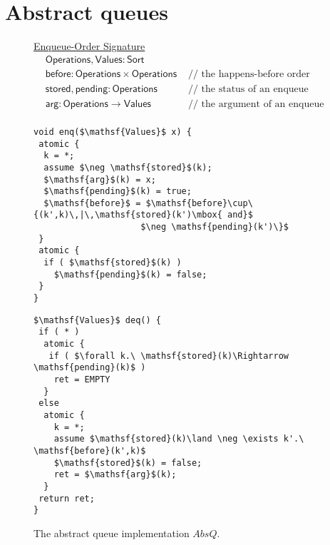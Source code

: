 \section{Abstract queues}


\begin{figure}[t]
{	\centering
	\underline{Enqueue-Order Signature}
	\begin{align*}
		& \mathsf{Operations}, \mathsf{Values} : \mathsf{Sort} \\
		& \mathsf{before} : \mathsf{Operations} \times \mathsf{Operations} &\mbox{ // the happens-before order between enqueues} \\
		& \mathsf{stored}, \mathsf{pending} : \mathsf{Operations} &\mbox{ // the status of an enqueue} \\
		& \mathsf{arg} : \mathsf{Operations} \rightarrow \mathsf{Values} &\mbox{ // the argument of an enqueue} \\
	\end{align*}
}

\begin{minipage}[t]{6cm}
\begin{lstlisting}
void enq($\mathsf{Values}$ x) {
 atomic {
  k = *; 
  assume $\neg \mathsf{stored}$(k);
  $\mathsf{arg}$(k) = x;
  $\mathsf{pending}$(k) = true;
  $\mathsf{before}$ = $\mathsf{before}\cup\{(k',k)\,|\,\mathsf{stored}(k')\mbox{ and}$
                     $\neg \mathsf{pending}(k')\}$  
 }
 atomic {
  if ( $\mathsf{stored}$(k) )
    $\mathsf{pending}$(k) = false;
 }
}
\end{lstlisting}
\end{minipage}
\begin{minipage}[t]{5cm}
\begin{lstlisting}
$\mathsf{Values}$ deq() {
 if ( * )
  atomic {
   if ( $\forall k.\ \mathsf{stored}(k)\Rightarrow \mathsf{pending}(k)$ )
    ret = EMPTY
  }
 else 
  atomic {
    k = *;
    assume $\mathsf{stored}(k)\land \neg \exists k'.\ \mathsf{before}(k',k)$
    $\mathsf{stored}$(k) = false;
    ret = $\mathsf{arg}$(k);
  }
 return ret;
}
\end{lstlisting}
\end{minipage}

	\caption{The abstract queue implementation $AbsQ$.}
	\label{fig:signatures}
\end{figure}

